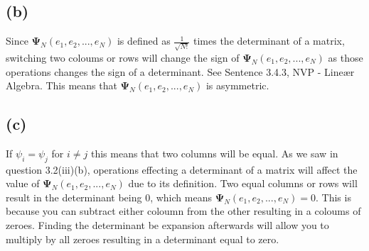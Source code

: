 \documentclass[11pt]{article}
\begin{document}
\subsection{(b)}

Since \(\bm{\Psi}_N(e_1,e_2,...,e_N)\) is defined as \(\frac{1}{\sqrt{N!}}\) times the determinant of a matrix, switching two coloums or rows will change the sign of \(\bm{\Psi}_N(e_1,e_2,...,e_N)\) as those operations changes the sign of a determinant.
See Sentence 3.4.3, NVP - Lineær Algebra.
This means that \(\bm{\Psi}_N(e_1,e_2,...,e_N)\) is asymmetric.

\subsection{(c)}

If \(\psi_i = \psi_j \) for \(i \neq j\) this means that two columns will be equal. As we saw in question 3.2(iii)(b), operations effecting a determinant of a matrix will affect the value of \(\bm{\Psi}_N(e_1,e_2,...,e_N)\) due to its definition.
Two equal columns or rows will result in the determinant being 0, which means \(\bm{\Psi}_N(e_1,e_2,...,e_N)  = 0 \). This is because you can subtract either coloumn from the other resulting in a coloums of zeroes.
Finding the determinant be expansion afterwards will allow you to multiply by all zeroes resulting in a determinant equal to zero.
\end{document}
